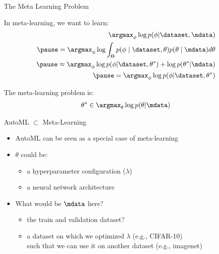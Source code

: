 \begin{frame}[c]{The Meta Learning Problem}

In meta-learning, we want to learn:
\begin{eqnarray}
\argmax_{\phi} \log p(\phi|\dataset, \mdata) \\
\pause
= \argmax_{\phi} \log \int_{\Theta} p(\phi \mid \dataset, \theta) p(\theta \mid \mdata) d\theta\\
\pause
\approx \argmax_{\phi} \log p(\phi | \dataset, \theta^*) + \log p(\theta^* | \mdata)\\
\pause
= \argmax_{\phi} \log p(\phi | \dataset, \theta^*)
\end{eqnarray}

\pause

The meta-learning problem is:
\begin{equation}
\theta^* \in \argmax_{\theta} \log p(\theta | \mdata)
\end{equation}


\end{frame}
\begin{frame}[c]{AutoML $\subset$ Meta-Learning}

\begin{itemize}
	\item AutoML can be seen as a special case of meta-learning
	\pause
	\medskip
	\item $\theta$ could be:
	\begin{itemize}
		\item a hyperparameter configuration ($\lambda$) 
		\item a neural network architecture
	\end{itemize}
	\pause
	\medskip
	\item What would be $\mdata$ here?
	\begin{itemize}
		\item the train and validation dataset?
		\item a dataset on which we optimized $\lambda$ (e.g., CIFAR-10)\\ such that we can use it on another dataset (e.g., imagenet)
	\end{itemize}
\end{itemize}	

\end{frame}

